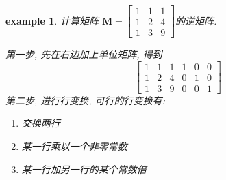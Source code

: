 \documentclass[12pt]{ctexbook}
\numberwithin{definition}{section}
\numberwithin{theorem}{section}
\numberwithin{exercise}{section}
\newtheorem{example}{example}
\numberwithin{example}{section}
\numberwithin{lemma}{section}
\begin{document}
    \begin{example}
        计算矩阵 \(\mathbf{M} = \begin{bmatrix}
            1 & 1 & 1 \\
            1 & 2 & 4 \\
            1 & 3 & 9
        \end{bmatrix}\)的逆矩阵.

        第一步, 先在右边加上单位矩阵, 得到
        \begin{equation}
            \begin{bmatrix}
                1 & 1 & 1 & 1 & 0 & 0 \\
                1 & 2 & 4 & 0 & 1 & 0 \\
                1 & 3 & 9 & 0 & 0 & 1
            \end{bmatrix}
        \end{equation}
        第二步, 进行行变换, 可行的行变换有:
        \begin{enumerate}
            \item 交换两行
            \item 某一行乘以一个非零常数
            \item 某一行加另一行的某个常数倍
        \end{enumerate}


\end{example}
\end{document}
